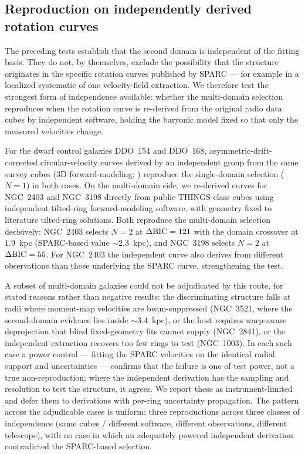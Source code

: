 \documentclass[twocolumn]{aastex631}
\newcommand{\dbic}{\Delta{\rm BIC}}
\begin{document}
\subsection{Reproduction on independently derived rotation curves} \label{sec:dataindep}

The preceding tests establish that the second domain is independent of the
fitting basis. They do not, by themselves, exclude the possibility that the
structure originates in the specific rotation curves published by SPARC --- for
example in a localized systematic of one velocity-field extraction. We therefore
test the strongest form of independence available: whether the multi-domain
selection reproduces when the rotation curve is re-derived from the original
radio data cubes by independent software, holding the baryonic model fixed so
that only the measured velocities change.

For the dwarf control galaxies DDO~154 and DDO~168, asymmetric-drift-corrected
circular-velocity curves derived by an independent group from the same survey
cubes (3D forward-modeling; \citealt{Iorio2017}) reproduce the single-domain
selection ($N=1$) in both cases. On the multi-domain side, we re-derived curves
for NGC~2403 and NGC~3198 directly from public THINGS-class cubes using
independent tilted-ring forward-modeling software, with geometry fixed to
literature tilted-ring solutions. Both reproduce the multi-domain selection
decisively: NGC~2403 selects $N=2$ at $\dbic = 121$ with the domain crossover at
$1.9$~kpc (SPARC-based value $\sim 2.3$~kpc), and NGC~3198 selects $N=2$ at
$\dbic = 55$. For NGC~2403 the independent curve also derives from different
observations than those underlying the SPARC curve, strengthening the test.

A subset of multi-domain galaxies could not be adjudicated by this route, for
stated reasons rather than negative results: the discriminating structure falls
at radii where moment-map velocities are beam-suppressed (NGC~3521, where the
second-domain evidence lies inside $\sim 3.4$~kpc), or the host requires
warp-aware deprojection that blind fixed-geometry fits cannot supply (NGC~2841),
or the independent extraction recovers too few rings to test (NGC~1003). In each
such case a power control --- fitting the SPARC velocities on the identical
radial support and uncertainties --- confirms that the failure is one of test
power, not a true non-reproduction; where the independent derivation has the
sampling and resolution to test the structure, it agrees. We report these as
instrument-limited and defer them to derivations with per-ring uncertainty
propagation. The pattern across the adjudicable cases is uniform: three
reproductions across three classes of independence (same cubes / different
software, different observations, different telescope), with no case in which an
adequately powered independent derivation contradicted the SPARC-based selection.
\end{document}
